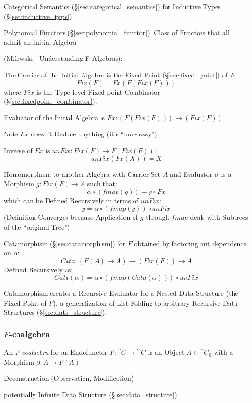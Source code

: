 Categorical Semantics (\S\ref{sec:categorical_semantics}) for
Inductive Types (\S\ref{sec:inductive_type})

Polynomial Functors (\S\ref{sec:polynomial_functor}): Class of
Functors that all admit an Initial Algebra %

(Milewski - Understanding F-Algebras):

The Carrier of the Initial Algebra is the Fixed Point
(\S\ref{sec:fixed_point}) of $F$:
\[
  Fix (F) = Fx (F (Fix (F)))
\]
where $Fix$ is the Type-level Fixed-point Combinator
(\S\ref{sec:fixedpoint_combinator}).

Evaluator of the Initial Algebra is $Fx : (F (Fix (F))) \rightarrow
(Fix (F))$

\fist Note $Fx$ doesn't Reduce anything (it's ``non-lossy'')

Inverse of $Fx$ is $unFix : Fix (F) \rightarrow F (Fix (F))$:
\[
  unFix (Fx (X)) = X
\]

Homomorphism to another Algebra with Carrier Set $A$ and Evaluator
$\alpha$ is a Morphism $g : Fix (F) \rightarrow A$ such that:
\[
  \alpha \circ (fmap (g)) = g \circ Fx
\]
which can be Defined Recursively in terms of $unFix$:
\[
  g = \alpha \circ (fmap (g)) \circ unFix
\]
(Definition Converges because Application of $g$ through $fmap$ deals
with Subtrees of the ``original Tree'')

Catamorphism (\S\ref{sec:catamorphism}) for $F$ obtained by factoring
out dependence on $\alpha$:
\[
  Cata : (F (A) \rightarrow A) \rightarrow (Fix (F)) \rightarrow A
\]
Defined Recursively as:
\[
  Cata (\alpha) = \alpha \circ (fmap (Cata (\alpha))) \circ unFix
\]

Catamorphism creates a Recursive Evaluator for a Nested Data Structure
(the Fixed Point of $F$), a generalization of List Folding to
arbitrary Recursive Data Structures (\S\ref{sec:data_structure}).



\subsubsection{$F$-coalgebra}\label{sec:f_coalgebra}

An \emph{$F$-coalgebra} for an Endofunctor $F : \cat{C} \rightarrow
\cat{C}$ is an Object $A \in \cat{C}_0$ with a Morphism $\beta : A
\rightarrow F(A)$ \cite{corfield08}

Deconstruction (Observation, Modification)

potentially Infinite Data Structure (\S\ref{sec:data_structure})


